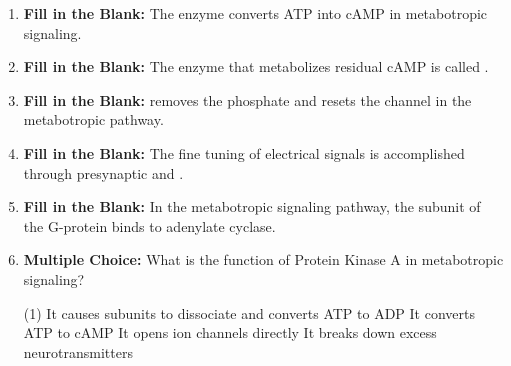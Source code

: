\begin{enumerate}[label=\textbf{Q2.5.\arabic*}]
      \item \textbf{Fill in the Blank:} The enzyme \underline{\hspace{3cm}} converts ATP into cAMP in metabotropic signaling. \\

      \item \textbf{Fill in the Blank:} The enzyme that metabolizes residual cAMP is called \underline{\hspace{3cm}}. \\
            
      \item \textbf{Fill in the Blank:} \underline{\hspace{3cm}} removes the phosphate and resets the channel in the metabotropic pathway. \\

      \item \textbf{Fill in the Blank:} The fine tuning of electrical signals is accomplished through presynaptic \underline{\hspace{3cm}} and \underline{\hspace{3cm}}. \\

      \item \textbf{Fill in the Blank:} In the metabotropic signaling pathway, the \underline{\hspace{3cm}} subunit of the G-protein binds to adenylate cyclase. \\
            
      \item \textbf{Multiple Choice:} What is the function of Protein Kinase A in metabotropic signaling?
            \begin{tasks}[label=\textcolor{\documentTheme}{(\Alph*)}, item-format=\color{\documentTheme}, label-width=1.5em, item-indent=1.7em](1)
                  \task It causes subunits to dissociate and converts ATP to ADP
                  \task It converts ATP to cAMP
                  \task It opens ion channels directly
                  \task It breaks down excess neurotransmitters
            \end{tasks}
            
\newpage
      

\end{enumerate}
